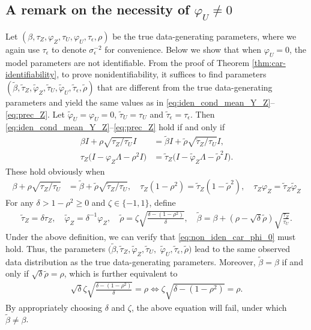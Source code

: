 \documentclass[11pt]{article}
\theoremstyle{definition}
\theoremstyle{remark}
\begin{document}
\subsection{A remark on the necessity of $\varphi_U\neq 0$}\label{sec:nece_phiU_car}
Let $(\beta, \tau_Z, \varphi_Z, \tau_U, \varphi_U, \tau_{\epsilon}, \rho)$ be the true data-generating parameters, where we again use $\tau_{\epsilon}$ to denote $\sigma_{\epsilon}^{-2}$ for convenience. 
Below we show that when $\varphi_U = 0$, the model parameters are not identifiable. 
From the proof of Theorem \ref{thm:car-identifiability}, 
to prove nonidentifiability, 
it suffices to find parameters 
$(\tilde{\beta}, \tilde{\tau}_Z, \tilde{\varphi}_Z, \tilde{\tau}_U, \tilde{\varphi}_U, \tilde{\tau}_{\epsilon}, \tilde{\rho})$
that are different from the true data-generating parameters and yield the same values as in \eqref{eq:iden_cond_mean_Y_Z}--\eqref{eq:prec_Z}. 
Let $\tilde{\varphi}_U=\varphi_U=0$, $\tilde{\tau}_U = \tau_U$ and $\tilde{\tau}_\epsilon = \tau_\epsilon$. Then \eqref{eq:iden_cond_mean_Y_Z}--\eqref{eq:prec_Z} hold if and only if 
\begin{align*}
    \beta I + \rho \sqrt{\tau_Z/\tau_U} I & = 
    \tilde{\beta} I + \tilde{\rho} \sqrt{\tilde{\tau}_Z/\tau_U} I, 
    \\ 
    \tau_Z \big( I - \varphi_Z \Lambda - \rho^2 I \big)
    & = 
    \tilde{\tau}_Z \big( I - \tilde{\varphi}_Z \Lambda - \tilde{\rho}^2 I \big).
\end{align*}
These hold obviously when 
\begin{align}\label{eq:non_iden_car_phi_0}
\beta + \rho \sqrt{\tau_Z/\tau_U} & = 
    \tilde{\beta} + \tilde{\rho} \sqrt{\tilde{\tau}_Z/\tau_U}, 
    \quad 
\tau_Z (1-\rho^2) = \tilde{\tau}_Z (1-\tilde{\rho}^2), 
\quad 
\tau_Z \varphi_Z = \tilde{\tau}_Z \tilde{\varphi}_Z
\end{align}
For any $\delta > 1 - \rho^2 \ge 0$ and $\zeta \in \{-1,1\}$, define 
\begin{align*}
    \tilde{\tau}_Z = \delta \tau _Z, 
    \quad 
    \tilde{\varphi}_Z = \delta^{-1} \varphi_Z,
    \quad 
    \tilde{\rho} = \zeta \sqrt{\frac{\delta - (1-\rho^2)}{\delta}}, 
    \quad 
    \tilde{\beta} =  \beta + (\rho - \sqrt{\delta}\tilde{\rho})\sqrt{\frac{\tau_Z}{\tau_U}} .
\end{align*}
Under the above definition, we can verify that \eqref{eq:non_iden_car_phi_0} must hold. 
Thus, the parameters $(\tilde{\beta}, \tilde{\tau}_Z, \tilde{\varphi}_Z, \tilde{\tau}_U,$ $\tilde{\varphi}_U, \tilde{\tau}_{\epsilon}, \tilde{\rho})$ lead to the same observed data distribution as the true data-generating parameters. 
Moreover, $\tilde{\beta} = \beta$ if and only if 
$\sqrt{\delta}\tilde{\rho} = \rho$, which is further equivalent to
\begin{align*}
    \sqrt{\delta}\zeta \sqrt{\frac{\delta - (1-\rho^2)}{\delta}} = \rho 
    \Longleftrightarrow 
    \zeta \sqrt{\delta - (1-\rho^2)} = \rho. 
\end{align*}
By appropriately choosing $\delta$ and $\zeta$, 
the above equation will fail, under which 
$\tilde{\beta} \ne \beta$.
\end{document}
